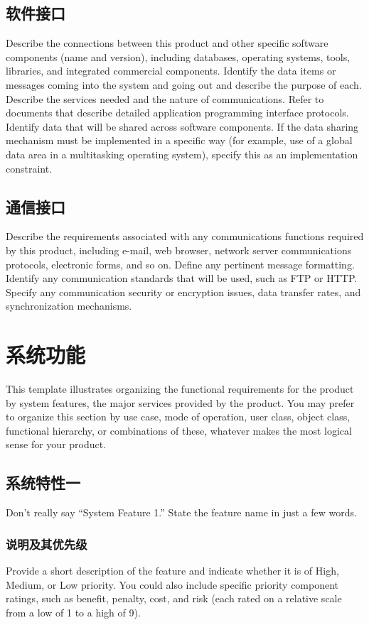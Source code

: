 \documentclass{ctexart}
\begin{document}
\subsection{软件接口}
Describe the connections between this product and other specific software 
components (name and version), including databases, operating systems, tools, 
libraries, and integrated commercial components. Identify the data items or 
messages coming into the system and going out and describe the purpose of each.  
Describe the services needed and the nature of communications. Refer to 
documents that describe detailed application programming interface protocols.  
Identify data that will be shared across software components. If the data 
sharing mechanism must be implemented in a specific way (for example, use of a 
global data area in a multitasking operating system), specify this as an 
implementation constraint.


\subsection{通信接口}
Describe the requirements associated with any communications functions 
required by this product, including e-mail, web browser, network server 
communications protocols, electronic forms, and so on. Define any pertinent 
message formatting. Identify any communication standards that will be used, such 
as FTP or HTTP. Specify any communication security or encryption issues, data 
transfer rates, and synchronization mechanisms.



\section{系统功能}
This template illustrates organizing the functional requirements for the 
product by system features, the major services provided by the product. You may 
prefer to organize this section by use case, mode of operation, user class, 
object class, functional hierarchy, or combinations of these, whatever makes the 
most logical sense for your product.
\subsection{系统特性一}
Don't really say ``System Feature 1.'' State the feature name in just a few 
words.
\subsubsection{说明及其优先级}
Provide a short description of the feature and indicate whether it is of 
High, Medium, or Low priority. You could also include specific priority 
component ratings, such as benefit, penalty, cost, and risk (each rated on a 
relative scale from a low of 1 to a high of 9).
\end{document}
